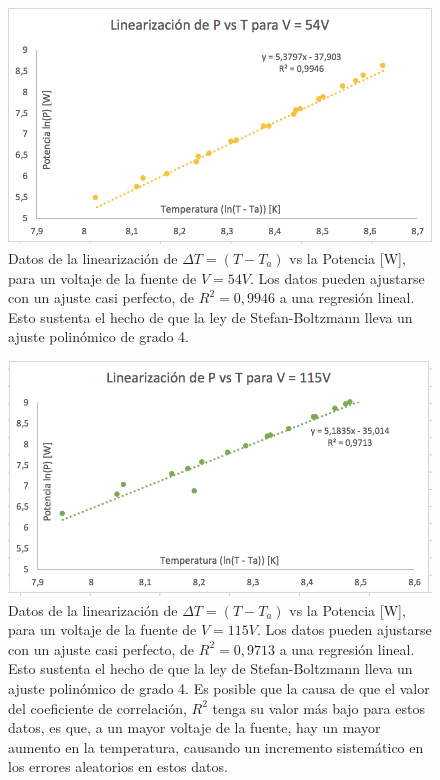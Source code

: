 \documentclass[%
 reprint,
 amsmath,amssymb,
 aps,
]{revtex4-1}
\begin{document}
\begin{figure}[H]
    \centering
    \includegraphics[scale= 0.5]{graf3lin.png}
    \caption{Datos de la linearización de $\Delta T = (T - T_{a})$ vs la Potencia [W], para un voltaje de la fuente de $V = 54 V$. Los datos pueden ajustarse con un ajuste casi perfecto, de $R^2 = 0,9946$ a una regresión lineal. Esto sustenta el hecho de que la ley de Stefan-Boltzmann lleva un ajuste polinómico de grado 4.}
    \label{fig:Figura 5}
    
\end{figure}\begin{figure}[H]
    \centering
    \includegraphics[scale= 0.5]{graf4lin.png}
    \caption{Datos de la linearización de $\Delta T = (T - T_{a})$ vs la Potencia [W], para un voltaje de la fuente de $V = 115 V$. Los datos pueden ajustarse con un ajuste casi perfecto, de $R^2 = 0,9713$ a una regresión lineal. Esto sustenta el hecho de que la ley de Stefan-Boltzmann lleva un ajuste polinómico de grado 4. Es posible que la causa de que el valor del coeficiente de correlación, $R^{2}$ tenga su valor más bajo para estos datos, es que, a un mayor voltaje de la fuente, hay un mayor aumento en la temperatura, causando un incremento sistemático en los errores aleatorios en estos datos.}
    \label{fig:Figura 5}
\end{figure}
\end{document}
